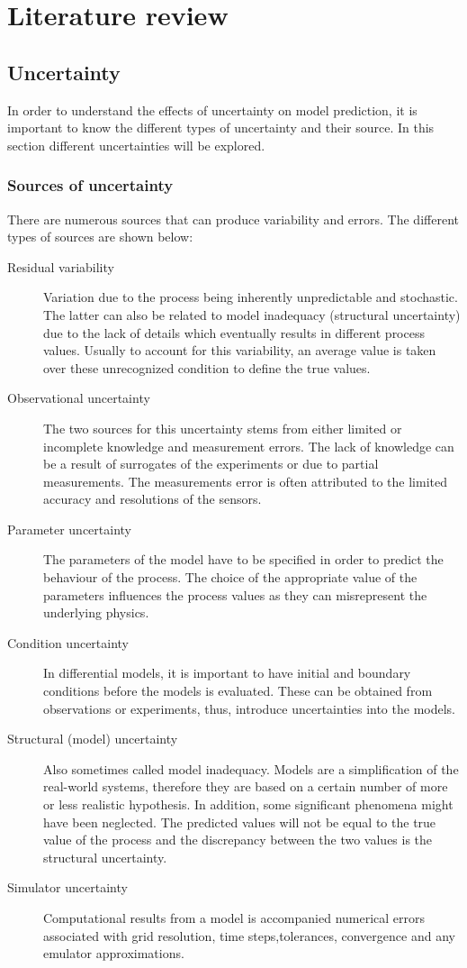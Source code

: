 \chapter{Literature review}
\label{chapterlabel3}

\section{Uncertainty}
In order to understand the effects of uncertainty on model prediction, it is important to know the different types of uncertainty and their source. In this section different  uncertainties will be explored.

\subsection{Sources of uncertainty}
There are numerous sources that can produce variability and errors. The different types of sources are shown below:
\begin{description}
\item[Residual variability] Variation due to the process being inherently unpredictable and stochastic. The latter can also be related to model inadequacy (structural uncertainty) due to the lack of details which eventually results in different process values. Usually to account for this variability, an average value is taken over these unrecognized condition to define the true values.
\item[Observational uncertainty] The two sources for this uncertainty stems from either limited or incomplete knowledge and measurement errors. The lack of knowledge can be a result of surrogates of the experiments or due to partial measurements. The measurements error is often attributed to the limited accuracy and resolutions of the sensors.
\item[Parameter uncertainty] The parameters of the model have to be specified in order to predict the behaviour of the process. The choice of the appropriate value of the parameters influences the process values as they can misrepresent the underlying physics.
\item[Condition uncertainty] In differential models, it is important to have initial and boundary conditions before the models is evaluated. These can be obtained from observations or experiments, thus, introduce uncertainties into the models.
\item[Structural (model) uncertainty] Also sometimes called model inadequacy. Models are a simplification of the real-world systems, therefore they are based on a certain number of more or less realistic hypothesis. In addition, some significant phenomena might have been neglected. The predicted values will not be equal to the true value of the process and the discrepancy between the two values is the structural uncertainty. 
\item[Simulator uncertainty] Computational results from a model is accompanied numerical errors associated with grid resolution, time steps,tolerances, convergence and any emulator approximations.
\end{description}


